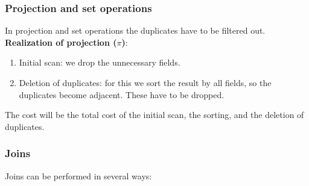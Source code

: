 \documentclass[margin=0px]{article}
\begin{document}
\subsubsection{Projection and set operations}

In projection and set operations the duplicates have to be filtered out.\\

\noindent \textbf{Realization of projection ($\pi$)}:

\begin{enumerate}
    \item	Initial scan: we drop the unnecessary fields.
    \item	Deletion of duplicates: for this we sort the result by all fields, so the duplicates become adjacent.
          These have to be dropped.
\end{enumerate}

\noindent The cost will be the total cost of the initial scan, the sorting, and the deletion of duplicates.

\subsubsection{Joins}

Joins can be performed in several ways:
\end{document}
